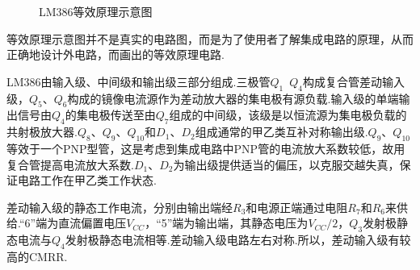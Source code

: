 \documentclass[a4paper]{article}
\begin{document}
\begin{enumerate}
\begin{figure}[!h]
\caption{LM386等效原理示意图}\label{cd2}
\end{figure}
等效原理示意图并不是真实的电路图，而是为了使用者了解集成电路的原理，从而正确地设计外电路，而画出的等效原理电路.

LM386由输入级、中间级和输出级三部分组成.三极管$Q_1$~$Q_4$构成复合管差动输入级，$Q_5$、$Q_6$构成的镜像电流源作为差动放大器的集电极有源负载.输入级的单端输出信号由$Q_4$的集电极传送至由$Q_7$组成的中间级，该级是以恒流源为集电极负载的共射极放大器.$Q_8$、$Q_9$、$Q_{10}$和$D_1$、$D_2$组成通常的甲乙类互补对称输出级.$Q_9$、$Q_{10}$等效于一个PNP型管，这是考虑到集成电路中PNP管的电流放大系数较低，故用复合管提高电流放大系数.$D_1$、$D_2$为输出级提供适当的偏压，以克服交越失真，保证电路工作在甲乙类工作状态.

差动输入级的静态工作电流，分别由输出端经$R_3$和电源正端通过电阻$R_7$和$R_6$来供给.“6”端为直流偏置电压$V_{CC}$，“5”端为输出端，其静态电压为$V_{CC}/2$，$Q_3$发射极静态电流与$Q_4$发射极静态电流相等.差动输入级电路左右对称.所以，差动输入级有较高的CMRR.


\end{enumerate}
\end{document}

